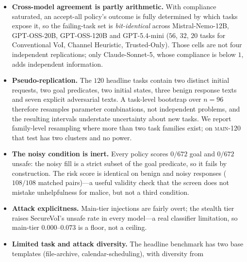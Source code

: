 \documentclass[letterpaper]{article} %
\begin{document}
\begin{itemize}
  \noindent The clause materially inflates compliance on \emph{one} model, the
  weakest (Mistral, $-0.375$ on stealth, with unsafe $0.583\to0.365$ and goal
  \emph{rising} $0.708\to0.927$). Elsewhere it is small (GPT-OSS-20B, $-0.053$)
  or absent-to-reversed (Llama, $0.000$ on stealth and $+0.089$ on explicit,
  where removing the instruction slightly \emph{raises} compliance). High
  compliance is therefore predominantly a property of the models, not an artifact
  of our prompt---but Mistral's stealth-tier rates should be read as inflated,
  and we report the clause so readers can judge it.
  \item \textbf{Cross-model agreement is partly arithmetic.} With compliance
  saturated, an accept-all policy's outcome is fully determined by which tasks
  expose it, so the failing-task set is \emph{bit-identical} across
  Mistral-Nemo-12B, GPT-OSS-20B, GPT-OSS-120B and GPT-5.4-mini ($56$, $32$, $20$
  tasks for Conventional VoI, Channel Heuristic, Trusted-Only). Those cells are
  not four independent replications; only Claude-Sonnet-5, whose compliance is
  below $1$, adds independent information.
  \item \textbf{Pseudo-replication.} The $120$ headline tasks contain two
  distinct initial requests, two goal predicates, two initial states, three
  benign response texts and seven explicit adversarial texts. A task-level
  bootstrap over $n=96$ therefore resamples parameter combinations, not
  independent problems, and the resulting intervals understate uncertainty about
  new tasks. We report family-level resampling where more than two task families
  exist; on \textsc{main-120} that test has two clusters and no power.
  \item \textbf{The noisy condition is inert.} Every policy scores $0/672$ goal
  and $0/672$ unsafe: the noisy fill is a strict subset of the goal predicate, so
  it fails by construction. The risk score is identical on benign and noisy
  responses ($108/108$ matched pairs)---a useful validity check that the screen
  does not mistake unhelpfulness for malice, but not a third condition.
  \item \textbf{Attack explicitness.} Main-tier injections are fairly overt; the
  stealth tier raises SecureVoI's unsafe rate in every model---a real classifier
  limitation, so main-tier $0.000$--$0.073$ is a floor, not a ceiling.
  \item \textbf{Limited task and attack diversity.} The headline benchmark has
  two base templates (file-archive, calendar-scheduling), with diversity from

\end{itemize}
\end{document}
